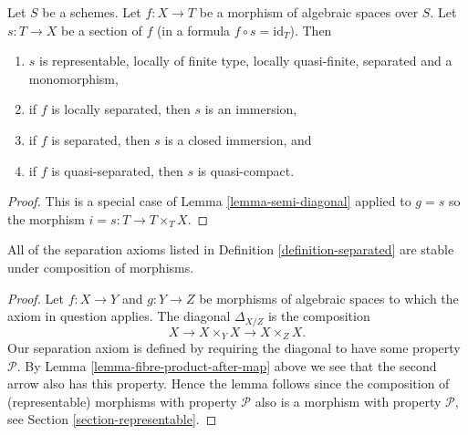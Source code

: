 \begin{lemma}
\label{lemma-section-immersion}
Let $S$ be a schemes.
Let $f : X \to T$ be a morphism of algebraic spaces over $S$.
Let $s : T \to X$ be a section of $f$ (in a formula
$f \circ s = \text{id}_T$). Then
\begin{enumerate}
\item $s$ is representable, locally of finite type, locally quasi-finite,
separated and a monomorphism,
\item if $f$ is locally separated, then $s$ is an immersion,
\item if $f$ is separated, then $s$ is a closed immersion, and
\item if $f$ is quasi-separated, then $s$ is quasi-compact.
\end{enumerate}
\end{lemma}

\begin{proof}
This is a special case of Lemma \ref{lemma-semi-diagonal} applied to
$g = s$ so the morphism $i = s : T \to T \times_T X$.
\end{proof}

\begin{lemma}
\label{lemma-composition-separated}
All of the separation axioms listed in Definition \ref{definition-separated}
are stable under composition of morphisms.
\end{lemma}

\begin{proof}
Let $f : X \to Y$ and $g : Y \to Z$ be morphisms of algebraic spaces
to which the axiom in question applies.
The diagonal $\Delta_{X/Z}$ is the composition
$$
X \longrightarrow X \times_Y X \longrightarrow X \times_Z X.
$$
Our separation axiom is defined by requiring the diagonal
to have some property $\mathcal{P}$. By
Lemma \ref{lemma-fibre-product-after-map} above we see that
the second arrow also has this property. Hence the lemma follows
since the composition of (representable) morphisms with property
$\mathcal{P}$ also is a morphism with property $\mathcal{P}$, see
Section \ref{section-representable}.
\end{proof}

